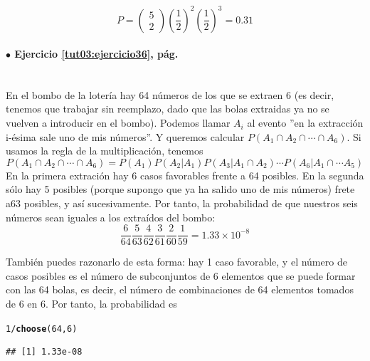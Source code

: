 \documentclass[10pt,a4paper]{article}\usepackage[]{graphicx}\usepackage[]{color}
\makeatletter
\newcommand{\hlnum}[1]{\textcolor[rgb]{0.686,0.059,0.569}{#1}}%
\newcommand{\hlopt}[1]{\textcolor[rgb]{0,0,0}{#1}}%
\newcommand{\hlstd}[1]{\textcolor[rgb]{0.345,0.345,0.345}{#1}}%
\newcommand{\hlkwd}[1]{\textcolor[rgb]{0.737,0.353,0.396}{\textbf{#1}}}%
\newenvironment{kframe}{%
 \def\at@end@of@kframe{}%
 \ifinner\ifhmode%
  \def\at@end@of@kframe{\end{minipage}}%
  \begin{minipage}{\columnwidth}%
 \fi\fi%
 \def\FrameCommand##1{\hskip\@totalleftmargin \hskip-\fboxsep
 \colorbox{shadecolor}{##1}\hskip-\fboxsep
     \hskip-\linewidth \hskip-\@totalleftmargin \hskip\columnwidth}%
 \MakeFramed {\advance\hsize-\width
   \@totalleftmargin\z@ \linewidth\hsize
   \@setminipage}}%
 {\par\unskip\endMakeFramed%
 \at@end@of@kframe}
\newenvironment{knitrout}{}{} %
\makeatother
\begin{document}
$$P=\left(\begin{array}{c}5 \\ 2 \end{array} \right)
\left(\frac{1}{2}\right)^2
\left(\frac{1}{2}\right)^3
= 0\text{.}31$$

\paragraph{\bf $\bullet$ Ejercicio \ref{tut03:ejercicio36}, pág. \pageref{tut03:ejercicio36}}
\label{tut03:ejercicio36:sol}\quad\\
En el bombo de la loter\'ia hay 64 n\'umeros de los que se extraen 6 (es decir, tenemos que trabajar sin reemplazo, dado que las 
bolas extraidas ya no se vuelven a introducir en el bombo). 
Podemos llamar $A_i$ al evento ''en la extracción i-ésima sale uno de mis números''. Y queremos calcular 
$P(A_1\cap A_2\cap \cdots\cap A_6)$. Si usamos la regla de la multiplicación, tenemos 
$$P(A_1\cap A_2\cap \cdots\cap A_6)=
P(A_1)P(A_2|A_1)P(A_3|A_1\cap A_2)\cdots P(A_6|A_1\cap \cdots A_5)$$
En la primera extración hay 6 casos favorables frente a 64 posibles. En la segunda sólo hay 5 posibles (porque supongo que ya ha salido uno de mis números) frete a63 posibles, y así sucesivamente. 
Por tanto, la probabilidad de que nuestros seis n\'umeros sean iguales a los
extra\'idos del bombo:
$$\frac{6}{64}\frac{5}{63}\frac{4}{62}\frac{3}{61}\frac{2}{60}\frac{1}{59} = 1.33 \times 10^{-8}$$

También puedes razonarlo de esta forma: hay 1 caso favorable, y el número de casos posibles es el número de subconjuntos de $6$ elementos que se puede formar con las 64 bolas, es decir, 
el número de combinaciones de 64 elementos tomados de 6 en 6. Por tanto, la probabilidad es 

\begin{knitrout}
\color{fgcolor}\begin{kframe}
\begin{alltt}
\hlnum{1}\hlopt{/}\hlkwd{choose}\hlstd{(}\hlnum{64}\hlstd{,}\hlnum{6}\hlstd{)}
\end{alltt}
\begin{verbatim}
## [1] 1.33e-08
\end{verbatim}
\end{kframe}
\end{knitrout}

\end{document}
